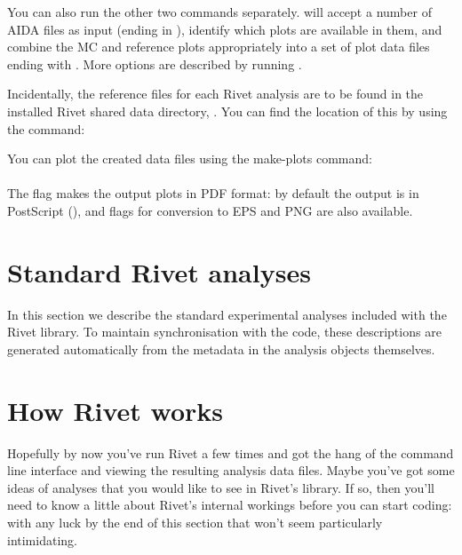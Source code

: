 \documentclass{JHEP3}
\begin{document}
You can also run the other two commands separately.
 will accept a number of AIDA files as input (ending in
), identify which plots are available in them, and combine the MC
and reference plots appropriately into a set of plot data files ending with
. More options are described by running .

Incidentally, the reference files for each Rivet analysis are to be found in the
installed Rivet shared data directory, . You
can find the location of this by using the  command:\\

\noindent
You can plot the created data files using the make-plots command:\\
\\
The  flag makes the output plots in PDF format: by default the output
is in PostScript (), and flags for conversion to EPS and PNG are also
available.



\cleardoublepage
\part{Standard Rivet analyses}
\label{part:analyses}


In this section we describe the standard experimental analyses included with the
Rivet library. To maintain synchronisation with the code, these descriptions are
generated automatically from the metadata in the analysis objects
themselves.





\cleardoublepage
\part{How Rivet works}
\label{part:writinganalyses}

Hopefully by now you've run Rivet a few times and got the hang of the command
line interface and viewing the resulting analysis data files. Maybe you've got
some ideas of analyses that you would like to see in Rivet's library. If so,
then you'll need to know a little about Rivet's internal workings before you can
start coding: with any luck by the end of this section that won't seem
particularly intimidating.
\end{document}
